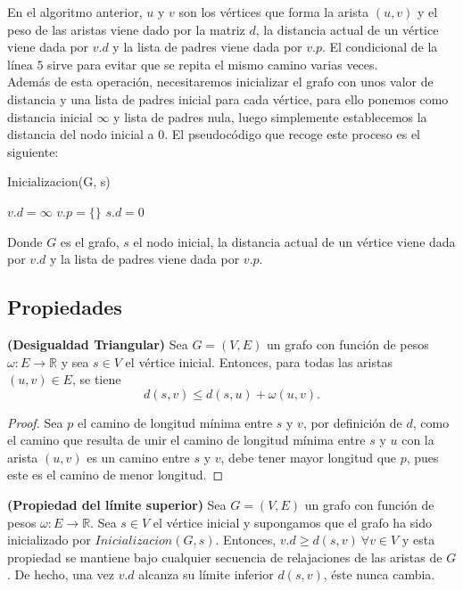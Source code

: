 En el algoritmo anterior, $u$ y $v$ son los vértices que forma la arista $(u,v)$ y el peso de las aristas viene dado por la matriz $d$, la distancia actual de un vértice viene dada por $v.d$ y la lista de padres viene dada por $v.p$. El condicional de la línea $5$ sirve para evitar que se repita el mismo camino varias veces.\\

Además de esta operación, necesitaremos inicializar el grafo con unos valor de distancia y una lista de padres inicial para cada vértice, para ello ponemos como distancia inicial $\infty$ y lista de padres nula, luego simplemente establecemos la distancia del nodo inicial a $0$. El pseudocódigo que recoge este proceso es el siguiente:

\begin{breakablealgorithm}
	\caption{Inicializacion(G, s)}
	\begin{algorithmic}[1]
			\State $v.d = \infty$
			\State $v.p = \{\}$
		\EndFor
		\State $s.d = 0$
	\end{algorithmic}
\end{breakablealgorithm}

Donde $G$ es el grafo, $s$ el nodo inicial, la distancia actual de un vértice viene dada por $v.d$ y la lista de padres viene dada por $v.p$. \\

\subsection{Propiedades}

\begin{lema}\label{lema:des_tri}
	\textbf{(Desigualdad Triangular)} Sea $G=(V,E)$ un grafo con función de pesos $\omega : E\rightarrow \mathbb{R}$ y sea $s\in V$ el vértice inicial. Entonces, para todas las aristas $(u,v)\in E$, se tiene
	$$d(s,v)\leq d(s,u)+\omega (u,v).$$
\end{lema}

\begin{proof}
	Sea $p$ el camino de longitud mínima entre $s$ y $v$, por definición de $d$, como el camino que resulta de unir el camino de longitud mínima entre $s$ y $u$ con la arista $(u,v)$ es un camino entre $s$ y $v$, debe tener mayor longitud que $p$, pues este es el camino de menor longitud.
\end{proof}

\begin{lema}\label{lema:lim_sup}
	\textbf{(Propiedad del límite superior)} Sea $G=(V,E)$ un grafo con función de pesos $\omega : E\rightarrow \mathbb{R}$. Sea $s\in V$ el vértice inicial y supongamos que el grafo ha sido inicializado por $Inicializacion(G,s)$. Entonces, $v.d \geq d(s,v)\ \forall v\in V$ y esta propiedad se mantiene bajo cualquier secuencia de relajaciones de las aristas de $G$. De hecho, una vez $v.d$ alcanza su límite inferior $d(s,v)$, éste nunca cambia.
\end{lema}

